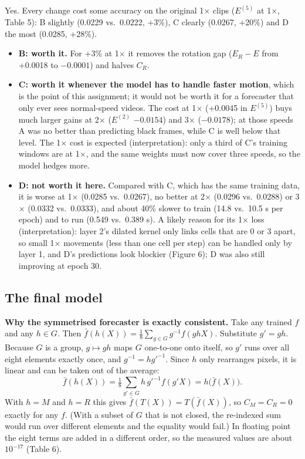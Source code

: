 Yes. Every change cost some accuracy on the original 1$\times$ clips ($E^{(5)}$ at 1$\times$, Table 5): B slightly (0.0229 vs.\ 0.0222, +3\%), C clearly (0.0267, +20\%) and D the most (0.0285, +28\%).
\begin{itemize}
\item \textbf{B: worth it.} For +3\% at 1$\times$ it removes the rotation gap ($E_R-E$ from +0.0018 to $-0.0001$) and halves $C_R$.
\item \textbf{C: worth it whenever the model has to handle faster motion}, which is the point of this assignment; it would not be worth it for a forecaster that only ever sees normal-speed videos. The cost at 1$\times$ (+0.0045 in $E^{(5)}$) buys much larger gains at 2$\times$ ($E^{(2)}$ $-0.0154$) and 3$\times$ ($-0.0178$); at those speeds A was no better than predicting black frames, while C is well below that level. The 1$\times$ cost is expected (interpretation): only a third of C's training windows are at 1$\times$, and the same weights must now cover three speeds, so the model hedges more.
\item \textbf{D: not worth it here.} Compared with C, which has the same training data, it is worse at 1$\times$ (0.0285 vs.\ 0.0267), no better at 2$\times$ (0.0296 vs.\ 0.0288) or 3$\times$ (0.0332 vs.\ 0.0333), and about 40\% slower to train (14.8 vs.\ 10.5 s per epoch) and to run (0.549 vs.\ 0.389 s). A likely reason for its 1$\times$ loss (interpretation): layer 2's dilated kernel only links cells that are 0 or 3 apart, so small 1$\times$ movements (less than one cell per step) can be handled only by layer 1, and D's predictions look blockier (Figure 6); D was also still improving at epoch 30.
\end{itemize}

\subsection{The final model}

\textbf{Why the symmetrised forecaster is exactly consistent.} Take any trained $f$ and any $h\in G$. Then $\bar f(h(X))=\frac18\sum_{g\in G}g^{-1}f(ghX)$. Substitute $g'=gh$. Because $G$ is a group, $g\mapsto gh$ maps $G$ one-to-one onto itself, so $g'$ runs over all eight elements exactly once, and $g^{-1}=hg'^{-1}$. Since $h$ only rearranges pixels, it is linear and can be taken out of the average:
\[
\bar f(h(X))=\tfrac18\sum_{g'\in G}h\,g'^{-1}f(g'X)=h\big(\bar f(X)\big).
\]
With $h=M$ and $h=R$ this gives $\bar f(T(X))=T(\bar f(X))$, so $C_M=C_R=0$ exactly for any $f$. (With a subset of $G$ that is not closed, the re-indexed sum would run over different elements and the equality would fail.) In floating point the eight terms are added in a different order, so the measured values are about $10^{-17}$ (Table 6).

